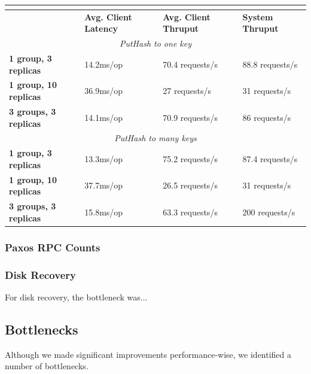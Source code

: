 \documentclass[letterpaper,10pt]{article}
\begin{document}
\begin{table}[h]
\begin{tabular}{|l|l|l|l|}
\hline
\multicolumn{4}{|c|}{\cellcolor[HTML]{C0C0C0}{\color[HTML]{000000} \textbf{Multipaxos}}}                              \\ \hline
                              & \textbf{Avg. Client Latency} & \textbf{Avg. Client Thruput} & \textbf{System Thruput} \\ \hline
\multicolumn{4}{|c|}{\textit{PutHash to one key}}                                                                     \\ \hline
\textbf{1 group, 3 replicas}  & 14.2ms/op                    & 70.4 requests/s              & 88.8 requests/s         \\ \hline
\textbf{1 group, 10 replicas} & 36.9ms/op                    & 27 requests/s                & 31 requests/s           \\ \hline
\textbf{3 groups, 3 replicas} & 14.1ms/op                    & 70.9 requests/s              & 86 requests/s           \\ \hline
\multicolumn{4}{|c|}{\textit{PutHash to many keys}}                                                                   \\ \hline
\textbf{1 group, 3 replicas}  & 13.3ms/op                    & 75.2 requests/s              & 87.4 requests/s         \\ \hline
\textbf{1 group, 10 replicas} & 37.7ms/op                    & 26.5 requests/s              & 31 requests/s           \\ \hline
\textbf{3 groups, 3 replicas} & 15.8ms/op                    & 63.3 requests/s              & 200 requests/s          \\ \hline
\end{tabular}
\end{table}

\subsubsection{Paxos RPC Counts}

\subsubsection{Disk Recovery}
For disk recovery, the bottleneck was...

\subsection{Bottlenecks}
Although we made significant improvements performance-wise, we
identified a number of bottlenecks.
\end{document}

